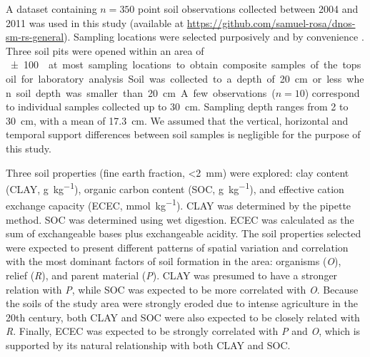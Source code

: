 A dataset containing $n = 350$ point soil observations collected between \num{2004} and \num{2011} 
\cite{PedronEtAl2006b, SamuelRosaEtAl2011a, MiguelEtAl2012, Samuel-RosaEtAl2013} was used in this study 
(available at \url{https://github.com/samuel-rosa/dnos-sm-rs-general}). Sampling locations were selected 
purposively and by convenience \cite{Samuel-RosaEtAl2014b}. Three soil pits were opened within an area of 
\SI{\pm100}{\m\square} at most sampling locations to obtain composite samples of the topsoil for laboratory 
analysis. Soil was collected to a depth of \SI{20}{\cm} or less when soil depth was smaller than \SI{20}{\cm}. 
A few observations ($n = 10$) correspond to individual samples collected up to \SI{30}{\cm}. Sampling depth 
ranges from \num{2} to \SI{30}{\cm}, with a mean of \SI{17.3}{\cm}. We assumed that the vertical, horizontal 
and temporal support differences between soil samples is negligible for the purpose of this study.

Three soil properties (fine earth fraction, \SI{<2}{\mm}) were explored: clay content (CLAY, 
\si{\gram\per\kilo\gram}), organic carbon content (SOC, \si{\gram\per\kilo\gram}), and effective cation 
exchange capacity (ECEC, \si{\milli\mole\per\kilo\gram}). CLAY was determined by the pipette method. SOC was 
determined using wet digestion. ECEC was calculated as the sum of exchangeable bases plus exchangeable 
acidity. The soil properties selected were expected to present different patterns of spatial variation and 
correlation with the most dominant factors of soil formation \cite{Jenny1941} in the area: organisms 
(\textit{O}), relief (\textit{R}), and parent material (\textit{P}). CLAY was presumed to have a stronger 
relation with \textit{P}, while SOC was expected to be more correlated with \textit{O}. Because the soils of 
the study area were strongly eroded due to intense agriculture in the \num{20}th century, both CLAY and SOC 
were also expected to be closely related with \textit{R}. Finally, ECEC was expected to be strongly correlated 
with \textit{P} and \textit{O}, which is supported by its natural relationship with both CLAY and SOC.

